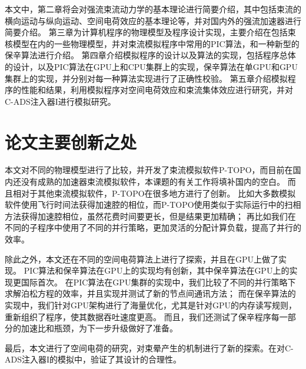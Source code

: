 本文中，第二章将会对强流束流动力学的基本理论进行简要介绍，其中包括束流的横向运动与纵向运动、空间电荷效应的基本理论等，并对国内外的强流加速器进行简要介绍。
第三章为计算机程序的物理模型及程序设计实现，主要介绍在包括束核模型在内的一些物理模型，并对束流模拟程序中常用的PIC算法，和一种新型的保辛算法进行介绍。
第四章介绍模拟程序的设计以及算法的实现，包括程序总体的设计，以及PIC算法在GPU上和CPU集群上的实现，保辛算法在单GPU和GPU集群上的实现，并分别对每一种算法实现进行了正确性校验。
第五章介绍模拟程序的性能和结果，利用模拟程序对空间电荷效应和束流集体效应进行研究，并对C-ADS注入器I进行模拟研究。

\section{论文主要创新之处}
本文对不同的物理模型进行了比较，并开发了束流模拟软件P-TOPO，而目前在国内还没有成熟的加速器束流模拟软件，本课题的有关工作将填补国内的空白。
而且相对于其他束流模拟软件，P-TOPO在很多地方进行了创新。
比如大多数模拟软件使用飞行时间法获得加速腔的相位，而P-TOPO使用类似于实际运行中的扫相方法获得加速腔相位，虽然花费时间要更长，但是结果更加精确；
再比如我们在不同的子程序中使用了不同的并行策略，更加灵活的分配计算负载，提高了并行的效率。

除此之外，本文还在不同的空间电荷算法上进行了探索，并且在GPU上做了实现。
PIC算法和保辛算法在GPU上的实现均有创新，其中保辛算法在GPU上的实现更国际首次。
在PIC算法在GPU集群的实现中，我们比较了不同的并行策略下求解泊松方程的效率，并且实现并测试了新的节点间通讯方法；
而在保辛算法的实现中，我们针对GPU架构进行了海量优化，尤其是针对GPU的内存读写规则，重新组织了程序，使其数据吞吐速度更高。
而且，我们还测试了保辛程序每一部分的加速比和瓶颈，为下一步升级做好了准备。

最后，本文进行了空间电荷的研究，对束晕产生的机制进行了新的探索。在对C-ADS注入器I的模拟中，验证了其设计的合理性。

